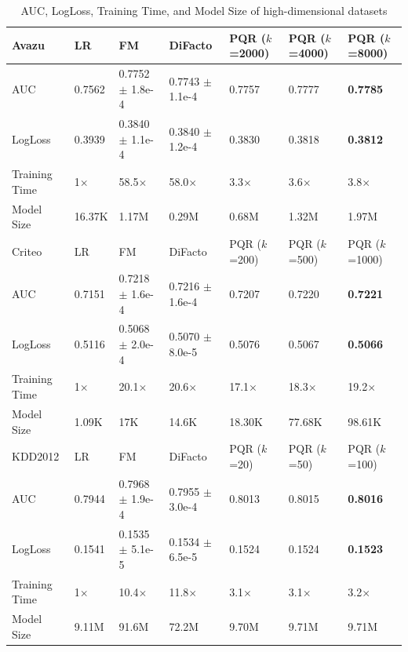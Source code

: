 \documentclass[letterpaper]{article} %
\theoremstyle{plain}
\theoremstyle{definition}
\begin{document}
\begin{table}
  \caption{AUC, LogLoss, Training Time, and Model Size of high-dimensional datasets}
  \label{auc_sparse}
  \centering
  \begin{tabular}{lllllll}
    \toprule
    Avazu         & LR        & FM                  & DiFacto             & PQR ($k$=2000)    & PQR ($k$=4000)    & PQR ($k$=8000)    \\
    \midrule
    AUC           & 0.7562    & 0.7752 $\pm$ 1.8e-4 & 0.7743 $\pm$ 1.1e-4 & 0.7757        & 0.7777        & \textbf{0.7785}        \\
    LogLoss       & 0.3939    & 0.3840 $\pm$ 1.1e-4 & 0.3840 $\pm$ 1.2e-4 & 0.3830        & 0.3818        & \textbf{0.3812}        \\
    Training Time & 1$\times$ & 58.5$\times$      & 58.0$\times$          & 3.3$\times$  & 3.6$\times$  & 3.8$\times$  \\
    Model Size    & 16.37K    & 1.17M               &  0.29M              & 0.68M          &  1.32M        & 1.97M         \\
    \midrule
    Criteo        & LR        & FM                  & DiFacto             & PQR ($k$=200) & PQR ($k$=500)     & PQR ($k$=1000)  \\
    \midrule
    AUC           & 0.7151    & 0.7218 $\pm$ 1.6e-4 & 0.7216 $\pm$ 1.6e-4 & 0.7207        & 0.7220        & \textbf{0.7221}   \\
    LogLoss       & 0.5116    & 0.5068 $\pm$ 2.0e-4 & 0.5070 $\pm$ 8.0e-5 & 0.5076        & 0.5067        & \textbf{0.5066}   \\
    Training Time & 1$\times$ & 20.1$\times$        & 20.6$\times$       & 17.1$\times$ & 18.3$\times$ & 19.2$\times$  \\
    Model Size    & 1.09K     & 17K                 & 14.6K               & 18.30K        & 77.68K        & 98.61K  \\
    \midrule
    KDD2012       & LR        & FM                  & DiFacto             & PQR ($k$=20)      & PQR ($k$=50)      & PQR ($k$=100)     \\
    \midrule
    AUC           & 0.7944    & 0.7968 $\pm$ 1.9e-4 & 0.7955 $\pm$ 3.0e-4 & 0.8013        & 0.8015        & \textbf{0.8016}        \\
    LogLoss       & 0.1541    & 0.1535 $\pm$ 5.1e-5 & 0.1534 $\pm$ 6.5e-5 & 0.1524        & 0.1524        & \textbf{0.1523}        \\
    Training Time & 1$\times$ & 10.4$\times$        & 11.8$\times$        & 3.1$\times$  & 3.1$\times$ & 3.2$\times$   \\
    Model Size    & 9.11M     & 91.6M              & 72.2M                & 9.70M         & 9.71M         & 9.71M         \\
    \bottomrule
  \end{tabular}
\end{table}
\end{document}
